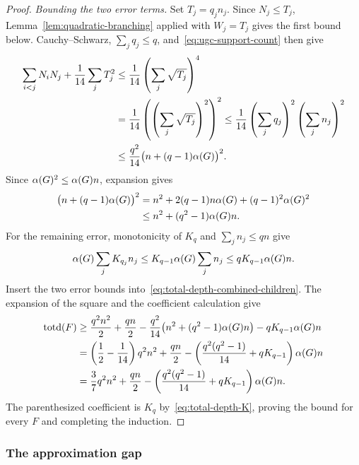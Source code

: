 \begin{proof}
\emph{Bounding the two error terms.}
Set $T_j=q_jn_j$. Since $N_j\leq T_j$, Lemma~\ref{lem:quadratic-branching}
applied with $W_j=T_j$ gives the first bound below. Cauchy--Schwarz,
$\sum_jq_j\le q$, and~\eqref{eq:ugc-support-count} then give
\[
 \begin{aligned}
 \sum_{i<j}N_iN_j+\frac1{14}\sum_jT_j^2
 &\le\frac1{14}\left(\sum_j\sqrt{T_j}\right)^4\\
 &=\frac1{14}\left(\left(\sum_j\sqrt{T_j}\right)^2\right)^2
 \leq\frac1{14}\left(\sum_jq_j\right)^2
          \left(\sum_jn_j\right)^2\\
 &\le\frac{q^2}{14}\bigl(n+(q-1)\alpha(G)\bigr)^2.
 \end{aligned}
\]
Since $\alpha(G)^2\le\alpha(G)n$, expansion gives
\[
 \begin{aligned}
 \bigl(n+(q-1)\alpha(G)\bigr)^2
 &=n^2+2(q-1)n\alpha(G)+(q-1)^2\alpha(G)^2\\
 &\le n^2+(q^2-1)\alpha(G)n.
 \end{aligned}
\]
For the remaining error, monotonicity of $K_q$ and
$\sum_jn_j\le qn$ give
\[
 \alpha(G)\sum_jK_{q_j}n_j
 \le K_{q-1}\alpha(G)\sum_jn_j
 \le qK_{q-1}\alpha(G)n.
\]
Insert the two error bounds into~\eqref{eq:total-depth-combined-children}.
The expansion of the square and the coefficient calculation give
\[
 \begin{aligned}
 \operatorname{totd}(F)&\geq\frac{q^2n^2}{2}+\frac{qn}{2}
 -\frac{q^2}{14}\bigl(n^2+(q^2-1)\alpha(G)n\bigr)
 -qK_{q-1}\alpha(G)n\\
 &=\left(\frac12-\frac1{14}\right)q^2n^2+\frac{qn}{2}
 -\left(\frac{q^2(q^2-1)}{14}+qK_{q-1}\right)\alpha(G)n\\
 &=\frac37q^2n^2+\frac{qn}{2}
 -\left(\frac{q^2(q^2-1)}{14}+qK_{q-1}\right)\alpha(G)n.
 \end{aligned}
\]
The parenthesized coefficient is $K_q$ by~\eqref{eq:total-depth-K},
proving the bound for every $F$ and completing the induction.
\end{proof}

\subsubsection{The approximation gap}

